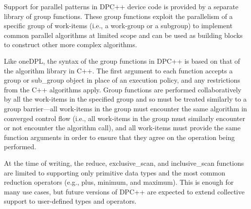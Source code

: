Support for parallel patterns in DPC++ device code is provided by a separate library of group functions. These group functions exploit the parallelism of a specific group of work-items (i.e., a work-group or a subgroup) to implement common parallel algorithms at limited scope and can be used as building blocks to construct other more complex algorithms.\par

Like oneDPL, the syntax of the group functions in DPC++ is based on that of the algorithm library in C++. The first argument to each function accepts a group or sub\_group object in place of an execution policy, and any restrictions from the C++ algorithms apply. Group functions are performed collaboratively by all the work-items in the specified group and so must be treated similarly to a group barrier—all work-items in the group must encounter the same algorithm in converged control flow (i.e., all work-items in the group must similarly encounter or not encounter the algorithm call), and all work-items must provide the same function arguments in order to ensure that they agree on the operation being performed.\par

At the time of writing, the reduce, exclusive\_scan, and inclusive\_scan functions are limited to supporting only primitive data types and the most common reduction operators (e.g., plus, minimum, and maximum). This is enough for many use cases, but future versions of DPC++ are expected to extend collective support to user-defined types and operators.\par

